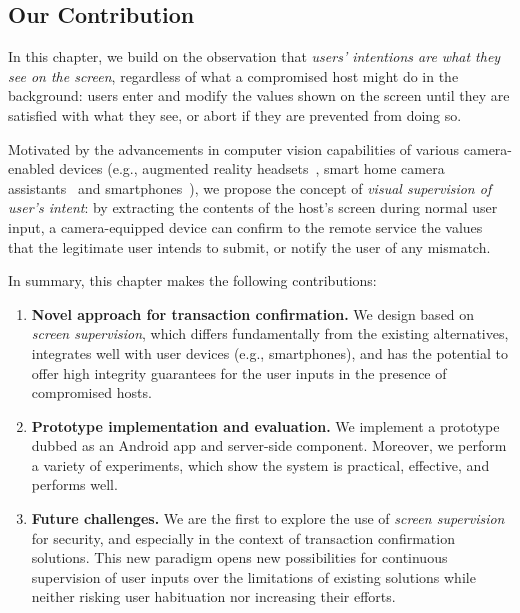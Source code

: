 \subsection{Our Contribution} In this chapter, we build on the observation that \textit{users' intentions are what they see on the screen}, regardless of what a compromised host might do in the background: users enter and modify the values shown on the screen until they are satisfied with what they see, or abort if they are prevented from doing so.

Motivated by the advancements in computer vision capabilities of various camera-enabled devices (e.g., augmented reality headsets~\cite{TimCookAR, HoloLens2}, smart home camera assistants~\cite{fleck2008smart, lenovoSmartHome} and smartphones~\cite{wald2018real, smartphonesCV}), we propose the concept of \emph{visual supervision of user's intent}: by extracting the contents of the host's screen during normal user input, a camera-equipped device can confirm to the remote service the values that the legitimate user intends to submit, or notify the user of any mismatch.


In summary, this chapter makes the following contributions:

\begin{enumerate}

\item \textbf{Novel approach for transaction confirmation.} We design \sysname based on \emph{screen supervision}, which differs fundamentally from the existing alternatives, integrates well with user devices (e.g., smartphones), and has the potential to offer high integrity guarantees for the user inputs in the presence of compromised hosts.

\item \textbf{Prototype implementation and evaluation.} We implement a prototype dubbed \sysname as an Android app and server-side component. Moreover, we perform a variety of experiments, which show the system is practical, effective, and performs well. 

\item \textbf{Future challenges.} We are the first to explore the use of \emph{screen supervision} for security, and especially in the context of transaction confirmation solutions. This new paradigm opens new possibilities for continuous supervision of user inputs over the limitations of existing solutions while neither risking user habituation nor increasing their efforts.


\end{enumerate}

